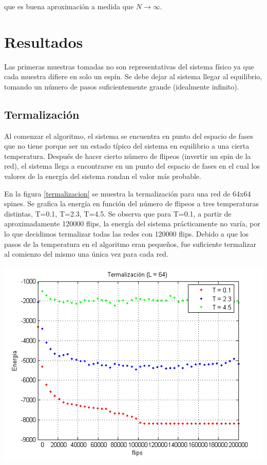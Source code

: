 \documentclass[twocolumn,Spanish,a4paper,11pt]{article}
\begin{document}
que es buena aproximación a medida que $N\rightarrow \infty$.

\section{Resultados}

Las primeras muestras tomadas no son representativas
del sistema físico ya que cada muestra difiere en solo
un espín. Se debe dejar al sistema llegar al equilibrio,
tomando un número de pasos suficientemente grande
(idealmente infinito). 

\subsection{Termalización}

Al comenzar el algoritmo, el sistema se encuentra en punto del espacio de fases que no tiene porque ser un estado típico del sistema en equilibrio a una cierta temperatura. Después de hacer cierto número de flipeos (invertir un spin de la red), el sistema llega a encontrarse 
en un punto del espacio de fases en el cual los valores de la energía del sistema rondan el valor más probable.

En la figura \ref{termalizacion} se muestra la termalización para una red de 64x64 spines. Se grafica la energía en función del número de flipeos a tres temperaturas distintas, T=0.1, T=2.3, T=4.5. Se observa que para T=0.1, a partir de aproximadamente 120000 flips, la energía del sistema prácticamente no varía, por lo que decidimos termalizar todas las redes con 120000 flips. Debido a que los pasos de la temperatura en el algoritmo eran pequeños, fue suficiente termalizar al comienzo del mismo una única vez para cada red.

\begin{minipage}{0.45\textwidth}									
\centering
\includegraphics[totalheight=0.25\textheight]{figuras/termalizacion.png}
\label{termalizacion}
\end{minipage}
\end{document}
